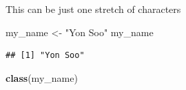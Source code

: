 \documentclass[]{book}
\newenvironment{Shaded}{\begin{snugshade}}{\end{snugshade}}
\newcommand{\KeywordTok}[1]{\textcolor[rgb]{0.13,0.29,0.53}{\textbf{#1}}}
\newcommand{\NormalTok}[1]{#1}
\newcommand{\StringTok}[1]{\textcolor[rgb]{0.31,0.60,0.02}{#1}}
\theoremstyle{definition}
\theoremstyle{definition}
\theoremstyle{definition}
\theoremstyle{remark}
\begin{document}
\begin{Shaded}
\begin{Highlighting}[]
\begin{Shaded}
\begin{Highlighting}[]
\begin{Shaded}
\begin{Highlighting}[]
This can be just one stretch of characters

\begin{Shaded}
\begin{Highlighting}[]
\NormalTok{my_name <-}\StringTok{ "Yon Soo"}
\NormalTok{my_name}
\end{Highlighting}
\end{Shaded}

\begin{verbatim}
## [1] "Yon Soo"
\end{verbatim}

\begin{Shaded}
\begin{Highlighting}[]
\KeywordTok{class}\NormalTok{(my_name)}
\end{Highlighting}
\end{Shaded}


\end{Highlighting}
\end{Shaded}
\end{Highlighting}
\end{Shaded}
\end{Highlighting}
\end{Shaded}
\end{document}
